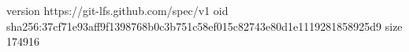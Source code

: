 version https://git-lfs.github.com/spec/v1
oid sha256:37cf71e93aff9f1398768b0c3b751c58ef015c82743e80d1e1119281858925d9
size 174916
